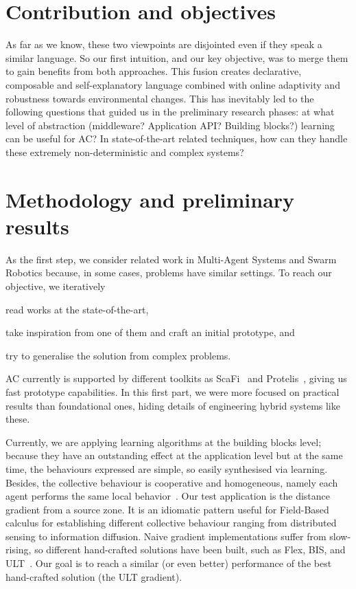 \documentclass[conference]{IEEEtran}
\begin{document}
\section{Contribution and objectives}
As far as we know, these two viewpoints are disjointed even if they speak a similar language. So our first intuition, and our key objective,
was to merge them to gain benefits from both approaches. This fusion creates declarative,
composable and self-explanatory language combined with online adaptivity and robustness towards environmental changes.
%
This has inevitably led to the following questions that guided us in the preliminary research phases: at what level of abstraction (middleware? Application API? Building blocks?) learning can be useful for AC? 
In state-of-the-art related techniques, how can they handle these extremely non-deterministic and complex systems?  
%
\section{Methodology and preliminary results}
%
As the first step, we consider related work in Multi-Agent Systems and Swarm Robotics because, in some cases, problems have similar settings.
To reach our objective, we iteratively 
\begin{enumerate*}[label=(\roman*)]
\item read works at the state-of-the-art,
\item take inspiration from one of them and craft an initial prototype, and
\item try to generalise the solution from complex problems.
\end{enumerate*}
AC currently is supported by different toolkits as ScaFi~\cite{DBLP:conf/ecoop/CasadeiV16} and Protelis~\cite{DBLP:conf/sac/PianiniVB15}, giving us fast prototype capabilities.
In this first part, we were more focused on practical results than foundational ones, hiding details of engineering hybrid systems like these.  

Currently, we are applying learning algorithms at the building blocks level; because they have an outstanding effect at the application level but
at the same time, the behaviours expressed are simple, so easily synthesised via learning.
Besides, the collective behaviour is cooperative and homogeneous, namely each agent performs the same local behavior~\cite{DBLP:journals/aamas/PanaitL05}.  %
%
Our test application is the distance gradient from a source zone. 
It is an idiomatic pattern useful for Field-Based calculus for establishing different collective behaviour ranging from distributed sensing to information diffusion.
%
Naive gradient implementations suffer from slow-rising, so different hand-crafted solutions have been built, such as Flex, BIS, and ULT~\cite{DBLP:conf/saso/AudritoCDV17}.
Our goal is to reach a similar (or even better) performance of the best hand-crafted solution (the ULT gradient).
\end{document}
